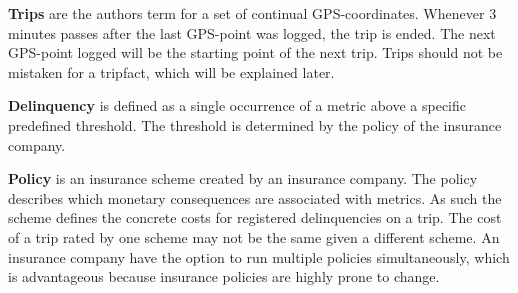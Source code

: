 \textbf{Trips} are the authors term for a set of continual GPS-coordinates. Whenever 3 minutes passes after the last GPS-point was logged, the trip is ended. The next GPS-point logged will be the starting point of the next trip. Trips should not be mistaken for a tripfact, which will be explained later.

\textbf{Delinquency} is defined as a single occurrence of a metric above a specific predefined threshold. The threshold is determined by the policy of the insurance company.

\textbf{Policy} is an insurance scheme created by an insurance company. The policy describes which monetary consequences are associated with metrics. As such the scheme defines the concrete costs for registered delinquencies on a trip. The cost of a trip rated by one scheme may not be the same given a different scheme. An insurance company have the option to run multiple policies simultaneously, which is advantageous because insurance policies are highly prone to change. 